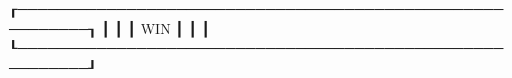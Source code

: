 ┎─────────────────────────────────────────────────────────┒
┃                                                         ┃
┃                           WIN                           ┃
┃                                                         ┃
┖─────────────────────────────────────────────────────────┚